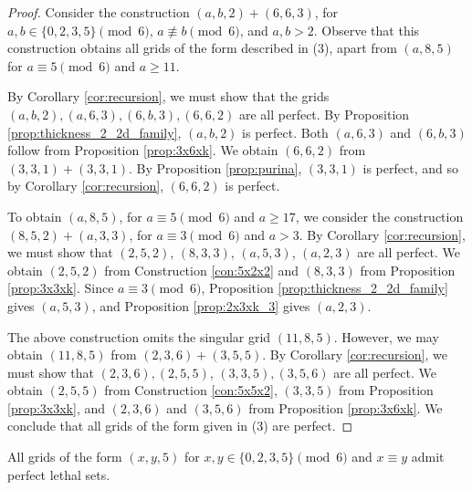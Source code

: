 \begin{proof}
Consider the construction $(a,b,2) + (6,6,3)$, for $a,b \in \{0,2,3,5\} \pmod 6$, $a \not\equiv b \pmod 6$, and $a,b > 2$. Observe that this construction obtains all grids of the form described in (3), apart from $(a,8,5)$ for $a \equiv 5 \pmod 6$ and $a \geq 11$.

By Corollary \ref{cor:recursion}, we must show that the grids $(a,b,2), (a,6,3), (6,b,3), (6,6,2)$ are all perfect. By Proposition \ref{prop:thickness_2_2d_family}, $(a,b,2)$ is perfect. Both $(a,6,3)$ and $(6,b,3)$ follow from Proposition \ref{prop:3x6xk}. We obtain $(6,6,2)$ from $(3,3,1)+(3,3,1)$. By Proposition \ref{prop:purina}, $(3,3,1)$ is perfect, and so by Corollary \ref{cor:recursion}, $(6,6,2)$ is perfect.

To obtain $(a,8,5)$, for $a \equiv 5 \pmod 6$ and $a \geq 17$, we consider the construction $(8,5,2) + (a,3,3)$, for $a \equiv 3 \pmod 6$ and $a>3$. By Corollary \ref{cor:recursion}, we must show that $(2,5,2)$, $(8,3,3)$, $(a,5,3)$, $(a,2,3)$ are all perfect. We obtain $(2,5,2)$ from Construction \ref{con:5x2x2} and $(8,3,3)$ from Proposition \ref{prop:3x3xk}. Since $a \equiv 3 \pmod 6$, Proposition \ref{prop:thickness_2_2d_family} gives $(a,5,3)$, and Proposition \ref{prop:2x3xk_3} gives $(a,2,3)$. 

The above construction omits the singular grid $(11,8,5)$. However, we may obtain $(11,8,5)$ from $(2,3,6)+(3,5,5)$. By Corollary \ref{cor:recursion}, we must show that $(2,3,6), (2,5,5)$, $(3,3,5), (3,5,6)$ are all perfect. We obtain $(2,5,5)$ from Construction \ref{con:5x5x2}, $(3,3,5)$ from Proposition \ref{prop:3x3xk}, and $(2,3,6)$ and $(3,5,6)$ from Proposition \ref{prop:3x6xk}. We conclude that all grids of the form given in (3) are perfect.
\end{proof}

\begin{lem}
\label{lem:thickness_5_case_4}
All grids of the form $(x,y,5)$ for $x,y \in \{0,2,3,5\} \pmod 6$ and $x \equiv y$ admit perfect lethal sets.
\end{lem}

